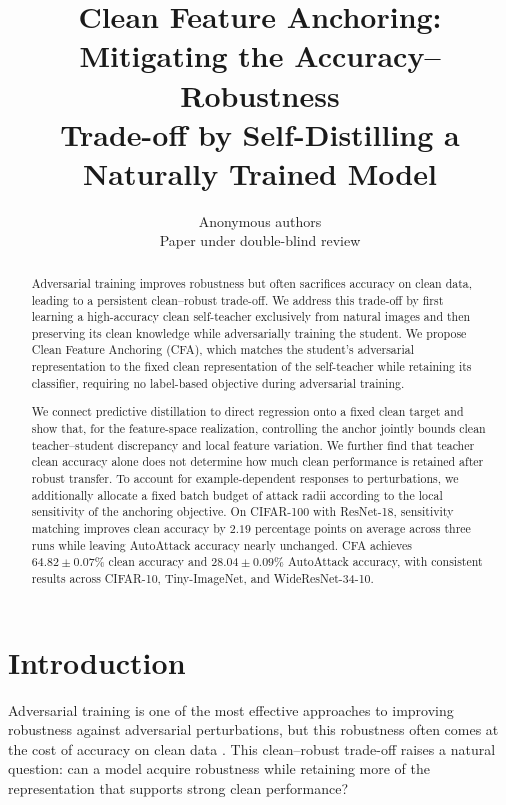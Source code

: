 \documentclass{article} %
\title{Clean Feature Anchoring: Mitigating the Accuracy--Robustness\\
Trade-off by Self-Distilling a Naturally Trained Model}
\author{
Anonymous authors\\
Paper under double-blind review
}
\theoremstyle{plain}
\begin{document}
\maketitle

\begin{abstract}
Adversarial training improves robustness but often sacrifices accuracy on
clean data, leading to a persistent clean--robust trade-off. We address this
trade-off by first learning a high-accuracy clean self-teacher exclusively
from natural images and then preserving its clean knowledge while
adversarially training the student. We propose Clean Feature Anchoring (CFA),
which matches the student's adversarial representation to the fixed clean
representation of the self-teacher while retaining its classifier, requiring
no label-based objective during adversarial training.

We connect predictive distillation to direct regression onto a fixed clean
target and show that, for the feature-space realization, controlling the
anchor jointly bounds clean teacher--student discrepancy and local feature
variation. We further find that teacher clean accuracy alone does not
determine how much clean performance is retained after robust transfer. To
account for example-dependent responses to perturbations, we additionally
allocate a fixed batch budget of attack radii according to the local
sensitivity of the anchoring objective. On CIFAR-100 with ResNet-18,
sensitivity matching improves clean accuracy by \(2.19\) percentage points on
average across three runs while leaving AutoAttack accuracy nearly unchanged.
CFA achieves \(64.82\mathbin{\pm}0.07\%\) clean accuracy and
\(28.04\mathbin{\pm}0.09\%\) AutoAttack accuracy, with consistent results
across CIFAR-10, Tiny-ImageNet, and WideResNet-34-10.
\end{abstract}

\section{Introduction}
\label{sec:intro}

Adversarial training is one of the most effective approaches to improving
robustness against adversarial perturbations, but this robustness often comes
at the cost of accuracy on clean data
\citep{PGD,tsipras2018robustness,TRADES}. This clean--robust trade-off raises
a natural question: can a model acquire robustness while retaining more of
the representation that supports strong clean performance?
\end{document}
